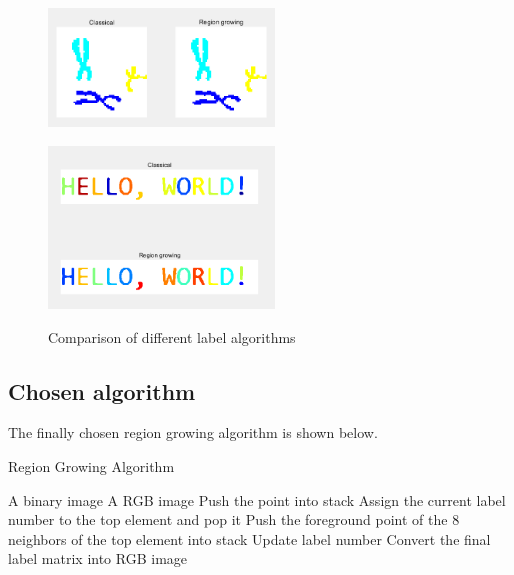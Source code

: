 \documentclass[hyperref]{article}
\theoremstyle{nonumberplain}
\begin{document}
	\begin{figure}[h]
		\centering
		\begin{minipage}[t]{0.48\textwidth}
			\centering
			\includegraphics[width=6cm]{label result 1.png}
			\label{fig18a}
		\end{minipage}
		\begin{minipage}[t]{0.48\textwidth}
			\centering
			\includegraphics[width=6cm]{label result 2.png}
			\label{fig18b}
		\end{minipage}
		\caption{Comparison of different label algorithms}
		\label{fig18}
	\end{figure}
	
	\subsection{Chosen algorithm}
	
	\hspace{1.0em}
	The finally chosen region growing algorithm is shown below.
	
	\begin{algorithm}
		\renewcommand{\algorithmicrequire}{\textbf{Input:}}
		\renewcommand{\algorithmicensure}{\textbf{Output:}}
		\caption{Region Growing Algorithm}
		\label{alg4}
		\begin{algorithmic}[1]
			\REQUIRE A binary image
			\ENSURE A RGB image
				\STATE Push the point into stack
				\REPEAT	
					\STATE Assign the current label number to the top element and pop it
					\STATE Push the foreground point of the 8 neighbors of the top element into stack
				\STATE Update label number
			\ENDIF
			\ENDFOR
			\STATE Convert the final label matrix into RGB image
		\end{algorithmic}  
	\end{algorithm}
	
\end{document}
